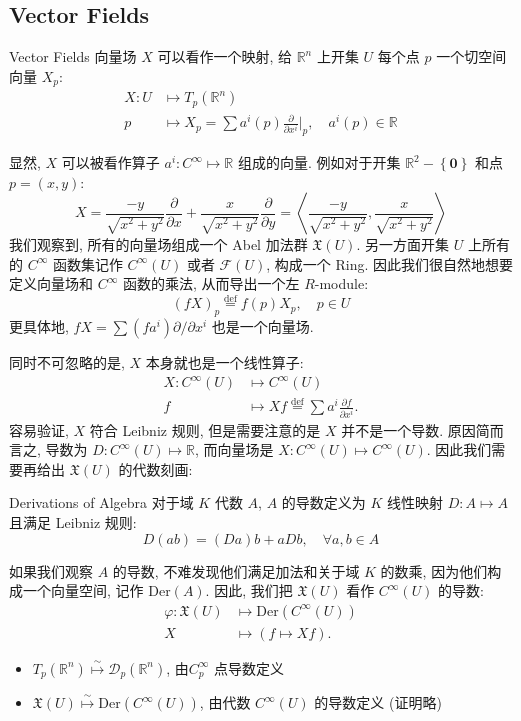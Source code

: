 \documentclass[a4paper, 12pt]{article}
\newcommand{\R}{\mathbb{R}}
\newcommand{\z}{\left}
\newcommand{\y}{\right}
\newcommand*{\defeq}{\stackrel{\text{def}}{=}}
\newcommand*{\isomap}{\stackrel{\sim}{\mapsto}}
\begin{document}
\subsection{Vector Fields}
\begin{Definition}{Vector Fields}{}
向量场 $X$ 可以看作一个映射, 给 $\R^n$ 上开集 $U$ 每个点 $p$ 一个切空间向量 $X_p$:
$$
\begin{aligned}
    X \colon U &\mapsto T_p(\R^n) \\
    p &\mapsto X_p = \sum{a^i(p)\frac{\partial}{\partial x^i}\Big|_p}, \quad a^i(p) \in \R
\end{aligned}
$$
\end{Definition}

显然, $X$ 可以被看作算子 $a^i \colon C^{\infty} \mapsto \R$ 组成的向量.
例如对于开集 $\R^2 - \z\{\mathbf{0}\y\}$ 和点 $p = (x,y)$:
$$
X = \frac{-y}{\sqrt{x^2 + y^2}} \frac{\partial }{\partial x} + \frac{x}{\sqrt{x^2 + y^2}}\frac{\partial}{\partial y} = \z<\frac{-y}{\sqrt{x^2 + y^2}},  \frac{x}{\sqrt{x^2 + y^2}}\y>
$$
我们观察到, 所有的向量场组成一个 Abel 加法群 $\mathfrak{X}(U)$.
另一方面开集 $U$ 上所有的 $C^{\infty}$ 函数集记作 $C^{\infty}(U)$ 或者 $\mathcal{F}(U)$, 构成一个 Ring.
因此我们很自然地想要定义向量场和 $C^{\infty}$ 函数的乘法, 从而导出一个左 $R$-module:
$$
(fX)_p \defeq f(p)X_p, \quad p \in U
$$
更具体地, $fX = \sum (fa^i)\partial / \partial x^i$ 也是一个向量场.

同时不可忽略的是, $X$ 本身就也是一个线性算子:
$$
\begin{aligned}
X \colon C^{\infty}(U) &\mapsto C^{\infty}(U) \\    
f &\mapsto Xf \defeq \sum a^i \frac{\partial f}{\partial x^i}.
\end{aligned}
$$
容易验证, $X$ 符合 Leibniz 规则, 但是需要注意的是 $X$ 并不是一个导数.
原因简而言之, 导数为 $D \colon C^{\infty}(U) \mapsto \R$, 而向量场是 $X \colon C^{\infty}(U) \mapsto C^{\infty}(U)$.
因此我们需要再给出 $\mathfrak{X}(U)$ 的代数刻画:

\begin{Definition}{Derivations of Algebra}{}
对于域 $K$ 代数 $A$, $A$ 的导数定义为 $K$ 线性映射 $D \colon A \mapsto A$ 且满足 Leibniz 规则:
$$
D(ab) = (Da)b + aDb, \quad \forall a,b \in A
$$
\end{Definition}
如果我们观察 $A$ 的导数, 不难发现他们满足加法和关于域 $K$ 的数乘, 因为他们构成一个向量空间, 记作 $\mathrm{Der}(A)$.  
因此, 我们把 $\mathfrak{X}(U)$ 看作 $C^{\infty}(U)$ 的导数:
$$
\begin{aligned}
    \varphi \colon \mathfrak{X}(U) &\mapsto \mathrm{Der}(C^{\infty}(U)) \\
    X &\mapsto (f\mapsto Xf). 
\end{aligned}
$$
\begin{Remark}{}{}
\begin{itemize}
    \item $T_p(\R^n) \isomap \mathcal{D}_p(\R^n)$, 由$C^{\infty}_p$ 点导数定义
    \item $\mathfrak{X}(U) \isomap \mathrm{Der}(C^{\infty}(U))$, 由代数 $C^{\infty}(U)$ 的导数定义 (证明略)
\end{itemize}
\end{Remark}
\end{document}
